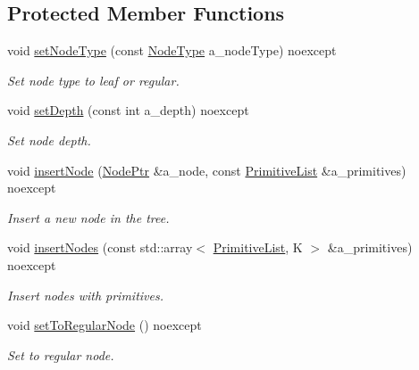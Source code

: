 \subsection*{Protected Member Functions}
\begin{DoxyCompactItemize}
\item 
void \hyperlink{classBVH_1_1NodeT_a964bd054b57fce2fec50505a65f6bacd}{set\+Node\+Type} (const \hyperlink{namespaceBVH_a7613f83a60cfae9aba31861110bd9e54}{Node\+Type} a\+\_\+node\+Type) noexcept
\begin{DoxyCompactList}\small\item\em Set node type to leaf or regular. \end{DoxyCompactList}\item 
void \hyperlink{classBVH_1_1NodeT_abdff7fdbe3694e2aeb788261175077cc}{set\+Depth} (const int a\+\_\+depth) noexcept
\begin{DoxyCompactList}\small\item\em Set node depth. \end{DoxyCompactList}\item 
void \hyperlink{classBVH_1_1NodeT_a8113c8dfa5ab6dc3cf931c5c8fdd6ddb}{insert\+Node} (\hyperlink{classBVH_1_1NodeT_a008f5c2c53adb1f5730d8478b48529b1}{Node\+Ptr} \&a\+\_\+node, const \hyperlink{classBVH_1_1NodeT_a19cce6e7fbe85eccb4a3718dd69f49b7}{Primitive\+List} \&a\+\_\+primitives) noexcept
\begin{DoxyCompactList}\small\item\em Insert a new node in the tree. \end{DoxyCompactList}\item 
\mbox{\label{classBVH_1_1NodeT_a75a7b385ec12897c1ade331ee24d9b74}} 
void \hyperlink{classBVH_1_1NodeT_a75a7b385ec12897c1ade331ee24d9b74}{insert\+Nodes} (const std\+::array$<$ \hyperlink{classBVH_1_1NodeT_a19cce6e7fbe85eccb4a3718dd69f49b7}{Primitive\+List}, K $>$ \&a\+\_\+primitives) noexcept
\begin{DoxyCompactList}\small\item\em Insert nodes with primitives. \end{DoxyCompactList}\item 
void \hyperlink{classBVH_1_1NodeT_a8f9c409918d61b0d0ad3dd6e2b692443}{set\+To\+Regular\+Node} () noexcept
\begin{DoxyCompactList}\small\item\em Set to regular node. \end{DoxyCompactList}\item 

\end{DoxyCompactItemize}
